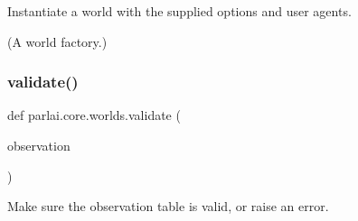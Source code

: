 \begin{DoxyVerb}Instantiate a world with the supplied options and user agents.

(A world factory.)
\end{DoxyVerb}
 \mbox{\label{namespaceparlai_1_1core_1_1worlds_afc3fad603b7bce41dbdc9cdc04a9c794}} 
\subsubsection{\texorpdfstring{validate()}{validate()}}
{\footnotesize\ttfamily def parlai.\+core.\+worlds.\+validate (\begin{DoxyParamCaption}\item[{}]{observation }\end{DoxyParamCaption})}

\begin{DoxyVerb}Make sure the observation table is valid, or raise an error.
\end{DoxyVerb}
 